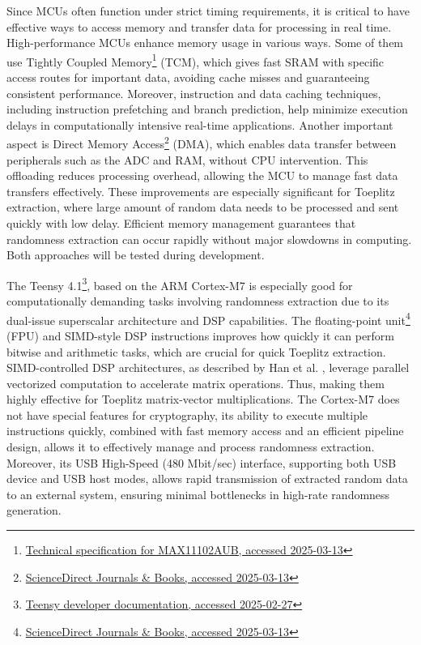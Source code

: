 Since MCUs often function under strict timing requirements, it is critical to have effective ways to access memory and transfer data for processing in real time. High-performance MCUs enhance memory usage in various ways. Some of them use Tightly Coupled Memory\footnote{\href{https://www.farnell.com/datasheets/1913106.pdf}{Technical specification for MAX11102AUB, accessed 2025-03-13}} (TCM), which gives fast SRAM with specific access routes for important data, avoiding cache misses and guaranteeing consistent performance. Moreover, instruction and data caching techniques, including instruction prefetching and branch prediction, help minimize execution delays in computationally intensive real-time applications. Another important aspect is Direct Memory Access\footnote{\href{https://www.sciencedirect.com/topics/computer-science/direct-memory-access}{ScienceDirect Journals \& Books, accessed 2025-03-13}} (DMA), which enables data transfer between peripherals such as the ADC and RAM, without CPU intervention. This offloading reduces processing overhead, allowing the MCU to manage fast data transfers effectively. These improvements are especially significant for Toeplitz extraction, where large amount of random data needs to be processed and sent quickly with low delay. Efficient memory management guarantees that randomness extraction can occur rapidly without major slowdowns in computing. Both approaches will be tested during development.

The Teensy 4.1\footnote{\href{https://www.pjrc.com/store/teensy41.html}{Teensy developer documentation, accessed 2025-02-27}}, based on the ARM Cortex-M7 is especially good for computationally demanding tasks involving randomness extraction due to its dual-issue superscalar architecture and DSP capabilities. The floating-point unit\footnote{\href{https://www.sciencedirect.com/topics/computer-science/floating-point-unit}{ScienceDirect Journals \& Books, accessed 2025-03-13}} (FPU) and SIMD-style DSP instructions improves how quickly it can perform bitwise and arithmetic tasks, which are crucial for quick Toeplitz extraction. SIMD-controlled DSP architectures, as described by Han et al. \cite{simd-dsp}, leverage parallel vectorized computation to accelerate matrix operations. Thus, making them highly effective for Toeplitz matrix-vector multiplications. The Cortex-M7 does not have special features for cryptography, its ability to execute multiple instructions quickly, combined with fast memory access and an efficient pipeline design, allows it to effectively manage and process randomness extraction. Moreover, its USB High-Speed (480 Mbit/sec) interface, supporting both USB device and USB host modes, allows rapid transmission of extracted random data to an external system, ensuring minimal bottlenecks in high-rate randomness generation.

